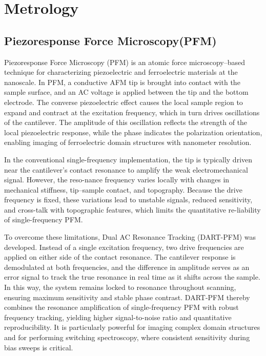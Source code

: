 \section{Metrology}
\label{sec:Metrology}

\subsection{Piezoresponse Force Microscopy(PFM)}
Piezoresponse Force Microscopy (PFM) is an atomic force microscopy–based technique for characterizing piezoelectric and ferroelectric materials at the nanoscale. 
In PFM, a conductive AFM tip is brought into contact with the sample surface, and an AC voltage is applied between the tip and the bottom electrode. 
The converse piezoelectric effect causes the local sample region to expand and contract at the excitation frequency, which in turn drives oscillations of the cantilever. 
The amplitude of this oscillation reflects the strength of the local piezoelectric response, while the phase indicates the polarization orientation, enabling imaging of ferroelectric domain structures with nanometer resolution.

In the conventional single-frequency implementation, the tip is typically driven near the cantilever’s contact resonance to amplify the weak electromechanical signal. 
However, the reso-nance frequency varies locally with changes in mechanical stiffness, tip–sample contact, and topography. 
Because the drive frequency is fixed, these variations lead to unstable signals, reduced sensitivity, and cross-talk with topographic features, which limits the quantitative re-liability of single-frequency PFM.

To overcome these limitations, Dual AC Resonance Tracking (DART-PFM) was developed. 
Instead of a single excitation frequency, two drive frequencies are applied on either side of the contact resonance. 
The cantilever response is demodulated at both frequencies, and the difference in amplitude serves as an error signal to track the true resonance in real time as it shifts across the sample. 
In this way, the system remains locked to resonance throughout scanning, ensuring maximum sensitivity and stable phase contrast. 
DART-PFM thereby combines the resonance amplification of single-frequency PFM with robust frequency tracking, yielding higher signal-to-noise ratio and quantitative reproducibility. 
It is particularly powerful for imaging complex domain structures and for performing switching spectroscopy, where consistent sensitivity during bias sweeps is critical.


